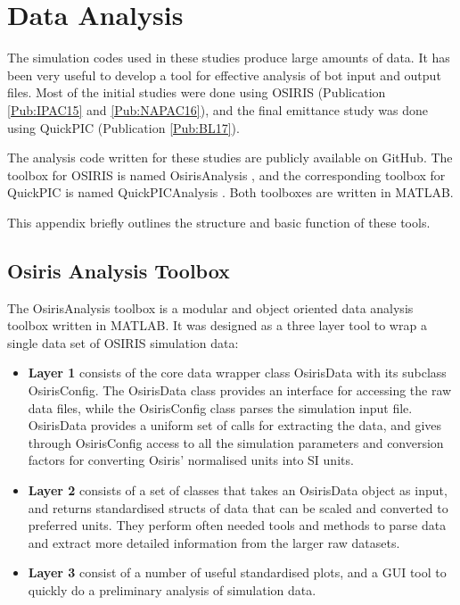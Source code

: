 %
%

\chapter{Data Analysis}
\label{Apx:DA}

The simulation codes used in these studies produce large amounts of data. It has been very useful to develop a tool for effective analysis of bot input and output files. Most of the initial studies were done using OSIRIS (Publication \ref{Pub:IPAC15} and \ref{Pub:NAPAC16}), and the final emittance study was done using QuickPIC (Publication \ref{Pub:BL17}).

The analysis code written for these studies are publicly available on GitHub. The toolbox for OSIRIS is named OsirisAnalysis \cite{code:osiris_analysis:2013}, and the corresponding toolbox for QuickPIC is named QuickPICAnalysis \cite{code:quickpic_analysis:2017}. Both toolboxes are written in MATLAB.

This appendix briefly outlines the structure and basic function of these tools.

\section{Osiris Analysis Toolbox}
\label{Tools:OA}

The OsirisAnalysis toolbox is a modular and object oriented data analysis toolbox written in MATLAB. It was designed as a three layer tool to wrap a single data set of OSIRIS simulation data:

\begin{itemize}
    \item \textbf{Layer 1} consists of the core data wrapper class OsirisData with its subclass OsirisConfig. The OsirisData class provides an interface for accessing the raw data files, while the OsirisConfig class parses the simulation input file. OsirisData provides a uniform set of calls for extracting the data, and gives through OsirisConfig access to all the simulation parameters and conversion factors for converting Osiris' normalised units into SI units.
    \item \textbf{Layer 2} consists of a set of classes that takes an OsirisData object as input, and returns standardised structs of data that can be scaled and converted to preferred units. They perform often needed tools and methods to parse data and extract more detailed information from the larger raw datasets.
    \item \textbf{Layer 3} consist of a number of useful standardised plots, and a GUI tool to quickly do a preliminary analysis of simulation data.
\end{itemize}

